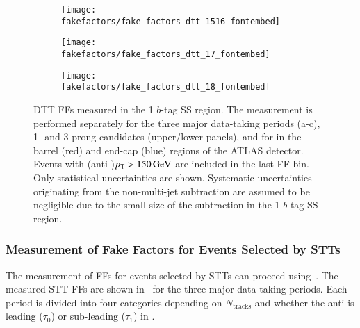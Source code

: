 \begin{figure}[htbp]
  \centering

  \begin{subfigure}{0.495\textwidth}
    \texttt{[image: fakefactors/fake\_factors\_dtt\_1516\_fontembed]}
  \end{subfigure}
  \begin{subfigure}{0.495\textwidth}
    \texttt{[image: fakefactors/fake\_factors\_dtt\_17\_fontembed]}
  \end{subfigure}

  \begin{subfigure}{0.495\textwidth}
    \texttt{[image: fakefactors/fake\_factors\_dtt\_18\_fontembed]}
  \end{subfigure}

  \caption[FFs for events selected by DTTs.]{DTT FFs measured in the 1 $b$-tag
    SS region. The measurement is performed separately for the three major
    data-taking periods (a-c), 1- and 3-prong \tauhadvis candidates (upper/lower
    panels), and for \tauhadvis in the barrel (red) and end-cap (blue) regions
    of the ATLAS detector. Events with (anti-)\tauhadvis $p_{\text{T}} > \SI{150}{\ensuremath{\text{GeV}}}$
    are included in the last FF bin. Only statistical uncertainties are
    shown. Systematic uncertainties originating from the non-multi-jet
    subtraction are assumed to be negligible due to the small size of the
    subtraction in the 1 $b$-tag SS region.}%
  \label{fig:mjfakes_fake_factors}
\end{figure}


\subsubsection{Measurement of Fake Factors for Events Selected by STTs}

The measurement of FFs for events selected by STTs can proceed
using~. The measured STT FFs are shown
in~ for the three major data-taking periods. Each
period is divided into four categories depending on $N_{\text{tracks}}$ and
whether the anti-\tauhadvis is leading ($\tau_0$) or sub-leading ($\tau_1$) in
\pT.


